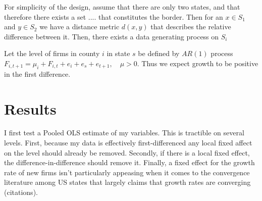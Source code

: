 \documentclass[11pt,a4paper]{article}\usepackage[]{graphicx}\usepackage[]{color}
\makeatletter
\newenvironment{kframe}{%
 \def\at@end@of@kframe{}%
 \ifinner\ifhmode%
  \def\at@end@of@kframe{\end{minipage}}%
  \begin{minipage}{\columnwidth}%
 \fi\fi%
 \def\FrameCommand##1{\hskip\@totalleftmargin \hskip-\fboxsep
 \colorbox{shadecolor}{##1}\hskip-\fboxsep
     \hskip-\linewidth \hskip-\@totalleftmargin \hskip\columnwidth}%
 \MakeFramed {\advance\hsize-\width
   \@totalleftmargin\z@ \linewidth\hsize
   \@setminipage}}%
 {\par\unskip\endMakeFramed%
 \at@end@of@kframe}
\newenvironment{knitrout}{}{} %
\makeatother
\begin{document}
For simplicity of the design, assume that there are only two states, and that therefore there exists a set  .... that constitutes the border. Then for an $x \in S_{1}$ and $y \in S_{2}$ we have a distance metric $d(x,y)$ that describes the relative difference between it. Then, there exists a data generating process on $S_{i}$

 Let the level of firms in county $i$ in state $s$ be defined by $AR(1)$ process $F_{i,t+1} = \mu_{i} + F_{i,t} + e_{i} + e_{s}+ e_{t+1}, \quad \mu > 0$. Thus we expect growth to be positive in the first difference.

\section{Results}

I first test a Pooled OLS estimate of my variables. This is tractible on several levels. First, because my data is effectively first-differenced any local fixed affect on the level should already be removed. Secondly, if there is a local fixed effect, the difference-in-difference should remove it. Finally, a fixed effect for the growth rate of new firms isn't particularly appeasing when it comes to the convergence literature among US states that largely claims that growth rates are converging (citations).

\begin{knitrout}\tiny
{}\color{fgcolor}\begin{kframe}


{\ttfamily\noindent\bfseries\color{errorcolor}{\#\# Error in df\$births\_ratio: object of type 'closure' is not subsettable}}

{\ttfamily\noindent\bfseries\color{errorcolor}{\#\# Error in resid(pols1): object 'pols1' not found}}

{\ttfamily\noindent\bfseries\color{errorcolor}{\#\# Error in eval(expr, envir, enclos): object 'polsresid' not found}}

{\ttfamily\noindent\bfseries\color{errorcolor}{\#\# Error in df\$ptax\_ratio\_L1: object of type 'closure' is not subsettable}}

{\ttfamily\noindent\bfseries\color{errorcolor}{\#\# Error in plot(df\$ptax\_ratio\_L1, polsresid): error in evaluating the argument 'x' in selecting a method for function 'plot': Error in df\$ptax\_ratio\_L1 : object of type 'closure' is not subsettable}}

{\ttfamily\noindent\bfseries\color{errorcolor}{\#\# Error in df\$stpr\_id: object of type 'closure' is not subsettable}}

{\ttfamily\noindent\bfseries\color{errorcolor}{\#\# Error in coeftest(pols1, vcov = pols1.vcovCL): object 'pols1' not found}}\end{kframe}
\end{knitrout}
\end{document}
